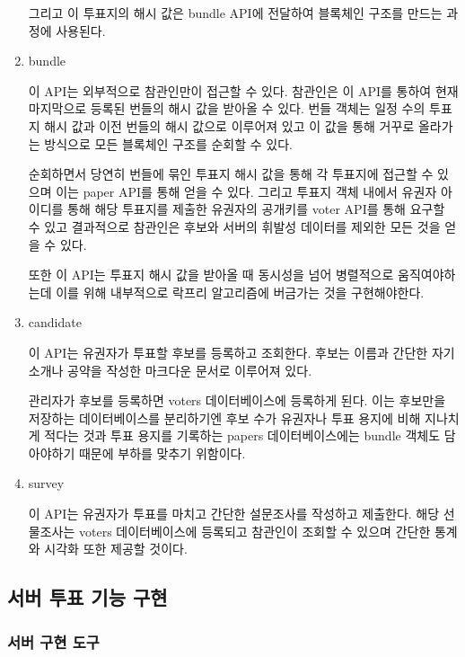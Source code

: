 \documentclass[8pt,a4paper,left=8mm,right=8mm,top=10mm,bottom=10mm]{article}
\begin{document}
\begin{enumerate}
    그리고 이 투표지의 해시 값은 bundle API에 전달하여 블록체인 구조를 만드는 과정에 사용된다.

    \item bundle
    
    이 API는 외부적으로 참관인만이 접근할 수 있다. 참관인은 이 API를 통하여 현재 마지막으로 등록된 번들의 해시 값을 받아올 수 있다. 번들 객체는 일정 수의 투표지 해시 값과 이전 번들의 해시 값으로 이루어져 있고 이 값을 통해 거꾸로 올라가는 방식으로 모든 블록체인 구조를 순회할 수 있다.

    순회하면서 당연히 번들에 묶인 투표지 해시 값을 통해 각 투표지에 접근할 수 있으며 이는 paper API를 통해 얻을 수 있다. 그리고 투표지 객체 내에서 유권자 아이디를 통해 해당 투표지를 제출한 유권자의 공개키를 voter API를 통해 요구할 수 있고 결과적으로 참관인은 후보와 서버의 휘발성 데이터를 제외한 모든 것을 얻을 수 있다.

    또한 이 API는 투표지 해시 값을 받아올 때 동시성을 넘어 병렬적으로 움직여야하는데 이를 위해 내부적으로 락프리 알고리즘에 버금가는 것을 구현해야한다.

    \item candidate
    
    이 API는 유권자가 투표할 후보를 등록하고 조회한다. 후보는 이름과 간단한 자기 소개나 공약을 작성한 마크다운 문서로 이루어져 있다.
    
    관리자가 후보를 등록하면 voters 데이터베이스에 등록하게 된다. 이는 후보만을 저장하는 데이터베이스를 분리하기엔 후보 수가 유권자나 투표 용지에 비해 지나치게 적다는 것과 투표 용지를 기록하는 papers 데이터베이스에는 bundle 객체도 담아야하기 때문에 부하를 맞추기 위함이다.

    \item survey
    
    이 API는 유권자가 투표를 마치고 간단한 설문조사를 작성하고 제출한다. 해당 선물조사는 voters 데이터베이스에 등록되고 참관인이 조회할 수 있으며 간단한 통계와 시각화 또한 제공할 것이다.

\end{enumerate}

\subsection{서버 투표 기능 구현}

    \subsubsection{서버 구현 도구}
\end{document}
